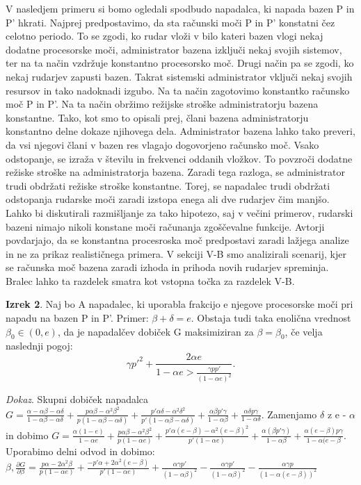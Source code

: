 \documentclass[12pt]{article}
\begin{document}
V nasledjem primeru si bomo ogledali spodbudo napadalca, ki napada bazen P in P' hkrati. Najprej predpostavimo, da sta računski moči P in P' konstatni čez celotno periodo. To se zgodi, ko rudar vloži v bilo kateri bazen vlogi nekaj dodatne procesorske moči, administrator bazena izključi nekaj svojih sistemov, ter na ta način vzdržuje konstantno procesorsko moč. Drugi način pa se zgodi, ko nekaj rudarjev zapusti bazen. Takrat sistemski administrator vključi nekaj svojih resursov in tako nadoknadi izgubo. Na ta način zagotovimo konstantko računsko moč P in P'. Na ta način obržimo režijske stroške administratorju bazena konstantne. Tako, kot smo to opisali prej, člani bazena administratorju konstantno delne dokaze njihovega dela. Administrator bazena lahko tako preveri, da vsi njegovi člani v bazen res vlagajo dogovorjeno računsko moč. Vsako odstopanje, se izraža v številu in frekvenci oddanih vložkov. To povzroči dodatne režiske stroške na administratorja bazena. Zaradi tega razloga, se administrator trudi obdržati režiske stroške konstantne. Torej, se napadalec trudi obdržati odstopanja rudarske moči zaradi izstopa enega ali dve rudarjev čim manjšo. Lahko bi diskutirali razmišljanje za tako hipotezo, saj v večini primerov, rudarski bazeni nimajo nikoli konstane moči računanja zgoščevalne funkcije. Avtorji povdarjajo, da se konstantna procesroska moč predpostavi zaradi lažjega analize in ne za prikaz realističnega primera. V sekciji V-B smo analizirali scenarij, kjer se računska moč bazena zaradi izhoda in prihoda novih rudarjev spreminja. Bralec lahko ta razdelek smatra kot vstopna točka za razdelek V-B.

\textbf{Izrek 2}. Naj bo A napadalec, ki uporabla frakcijo e njegove procesorske moči pri napadu na bazen P in P'. Primer: $\beta + \delta = e$. Obstaja tudi taka enolična vrednost $\beta_0 \in (0, e)$, da je napadalčev dobiček G maksimiziran za $\beta = \beta_0$, če velja naslednji pogoj:
\begin{equation}
\gamma p'^2 + \frac{2\alpha e}{1 - \alpha e > \frac{\gamma p p'}{(1 - \alpha e)^2}}.
\end{equation}

\textit{Dokaz}. Skupni dobiček napadalca $G = \frac{\alpha - \alpha\beta - \alpha\delta}{1 - \alpha\beta - \alpha\delta} + \frac{p \alpha\beta - \alpha^2\beta^2}{p(1 - \alpha\beta - \alpha\delta)} + \frac{p'\alpha\delta - \alpha^2\delta^2}{p'(1 - \alpha\beta - \alpha\delta)} + \frac{\alpha\beta p' \gamma}{1 - \alpha\beta} + \frac{\alpha\delta p \gamma}{1 - \alpha\delta}$. Zamenjamo $\delta$ z e - $\alpha$ in dobimo $G = \frac{\alpha(1 - e)}{1 - \alpha e} + \frac{p \alpha\beta - \alpha^2\beta^2}{p(1 - \alpha e)} + \frac{p' \alpha(e - \beta) - \alpha^2(e - \beta)^2}{p'(1 - \alpha e)} + \frac{\alpha(\beta p' \gamma)}{1 - \alpha\beta} + \frac{\alpha(e - \beta) p \gamma}{1 - \alpha(e - \beta}$. Uporabimo delni odvod in dobimo: $\beta, \frac{\partial G}{\partial \beta} = \frac{p\alpha - 2\alpha^2\beta}{p(1 - \alpha e)} + \frac{-p' \alpha + 2 \alpha^2(e - \beta)}{p' (1- \alpha e)} + \frac{\alpha\gamma p'}{(1 - \alpha\beta)^2} - \frac{\alpha\gamma p'}{(1 - \alpha\beta)^2} - \frac{\alpha\gamma p}{(1 - \alpha(e - \beta)) ^ 2}$
\end{document}
